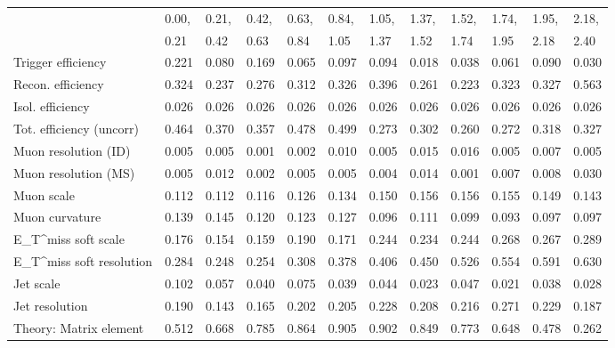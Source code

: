 \begin{tabular}{l|p{0.6cm}p{0.6cm}p{0.6cm}p{0.6cm}p{0.6cm}p{0.6cm}p{0.6cm}p{0.6cm}p{0.6cm}p{0.6cm}p{0.6cm}}
\hline
   & 0.00, & 0.21, & 0.42, & 0.63, & 0.84, & 1.05, & 1.37, & 1.52, & 1.74, & 1.95, & 2.18,  \\ 
   & 0.21 & 0.42 & 0.63 & 0.84 & 1.05 & 1.37 & 1.52 & 1.74 & 1.95 & 2.18 & 2.40  \\ 
\hline
Trigger efficiency                       & 0.221 & 0.080 & 0.169 & 0.065 & 0.097 & 0.094 & 0.018 & 0.038 & 0.061 & 0.090 & 0.030 \\
Recon. efficiency                        & 0.324 & 0.237 & 0.276 & 0.312 & 0.326 & 0.396 & 0.261 & 0.223 & 0.323 & 0.327 & 0.563 \\
Isol. efficiency                         & 0.026 & 0.026 & 0.026 & 0.026 & 0.026 & 0.026 & 0.026 & 0.026 & 0.026 & 0.026 & 0.026 \\
Tot. efficiency (uncorr)                 & 0.464 & 0.370 & 0.357 & 0.478 & 0.499 & 0.273 & 0.302 & 0.260 & 0.272 & 0.318 & 0.327 \\
Muon resolution (ID)                     & 0.005 & 0.005 & 0.001 & 0.002 & 0.010 & 0.005 & 0.015 & 0.016 & 0.005 & 0.007 & 0.005 \\
Muon resolution (MS)                     & 0.005 & 0.012 & 0.002 & 0.005 & 0.005 & 0.004 & 0.014 & 0.001 & 0.007 & 0.008 & 0.030 \\
Muon scale                               & 0.112 & 0.112 & 0.116 & 0.126 & 0.134 & 0.150 & 0.156 & 0.156 & 0.155 & 0.149 & 0.143 \\
Muon curvature                           & 0.139 & 0.145 & 0.120 & 0.123 & 0.127 & 0.096 & 0.111 & 0.099 & 0.093 & 0.097 & 0.097 \\
E_{T}^{miss} soft scale                  & 0.176 & 0.154 & 0.159 & 0.190 & 0.171 & 0.244 & 0.234 & 0.244 & 0.268 & 0.267 & 0.289 \\
E_{T}^{miss} soft resolution             & 0.284 & 0.248 & 0.254 & 0.308 & 0.378 & 0.406 & 0.450 & 0.526 & 0.554 & 0.591 & 0.630 \\
Jet scale                                & 0.102 & 0.057 & 0.040 & 0.075 & 0.039 & 0.044 & 0.023 & 0.047 & 0.021 & 0.038 & 0.028 \\
Jet resolution                           & 0.190 & 0.143 & 0.165 & 0.202 & 0.205 & 0.228 & 0.208 & 0.216 & 0.271 & 0.229 & 0.187 \\
Theory: Matrix element                   & 0.512 & 0.668 & 0.785 & 0.864 & 0.905 & 0.902 & 0.849 & 0.773 & 0.648 & 0.478 & 0.262 \\

\end{tabular}
